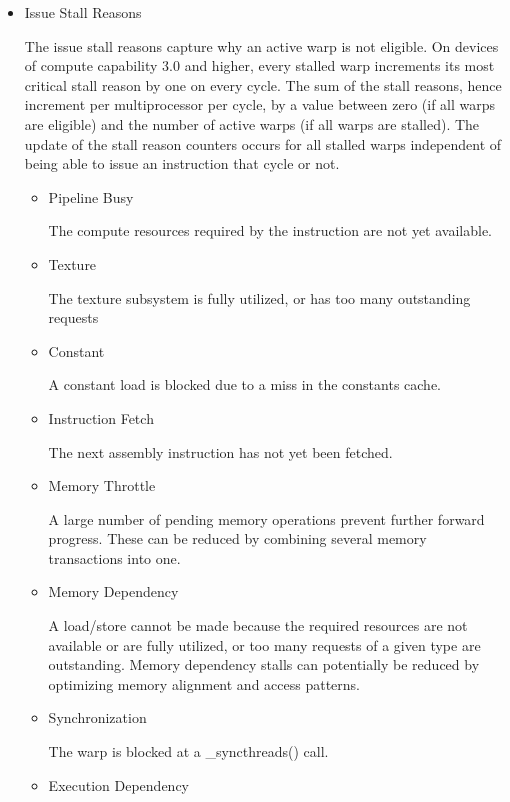 \documentclass[oneside,openright,12pt,final,en]{mgr}
\begin{document}
\begin{itemize}
	\item Issue Stall Reasons

	The issue stall reasons capture why an active warp is not eligible. On devices of compute capability 3.0 and higher, every stalled warp increments its most critical stall reason by one on every cycle. The sum of the stall reasons, hence increment per multiprocessor per cycle, by a value between zero (if all warps are eligible) and the number of active warps (if all warps are stalled). The update of the stall reason counters occurs for all stalled warps independent of being able to issue an instruction that cycle or not.
	
	
	\begin{itemize}
		\item Pipeline Busy   
		
		The compute resources required by the instruction are not yet available.
		
		\item Texture 
		
		The texture subsystem is fully utilized, or has too many outstanding requests
		
		\item Constant 
		
		A constant load is blocked due to a miss in the constants cache.
		
		\item Instruction Fetch  
		
		The next assembly instruction has not yet been fetched.
		
		\item Memory Throttle 
		
		A large number of pending memory operations prevent further forward progress. These can be reduced by combining several memory transactions into one.
		
		\item Memory Dependency  
		
		A load/store cannot be made because the required resources are not available or are fully utilized, or too many requests of a given type are outstanding. Memory dependency stalls can potentially be reduced by optimizing memory alignment and access patterns.
		
		\item Synchronization  
		
		 The warp is blocked at a \_syncthreads() call.
				
		\item Execution Dependency 
		

\end{itemize}
\end{itemize}
\end{document}
